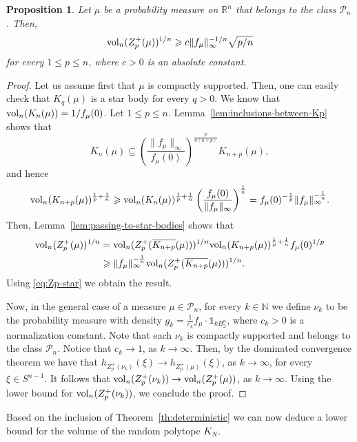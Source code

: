 \documentclass[11pt,leqno]{article}
\newtheorem{proposition}[theorem]{Proposition}
\theoremstyle{definition}
\theoremstyle{remark}
\numberwithin{equation}{section}
\newcommand{\vol}{{\rm vol}}
\newcommand{\ls}{\leqslant}
\newcommand{\gr}{\geqslant}
\newcommand{\1}{\textbf{1}}
\begin{document}
\begin{proposition}\label{prop:LYZ}
Let $\mu$ be a probability measure on $\mathbb{R}^n$ that belongs to the class $\mathcal{P}_n$. Then,
\begin{equation*}\vol_n(Z_p^+(\mu))^{1/n}\gr c\|f_{\mu}\|_{\infty}^{-1/n}\sqrt{p/n}\end{equation*}
for every $1\ls p\ls n$, where $c>0$ is an absolute constant.
\end{proposition}

\begin{proof} Let us assume first that $\mu$ is compactly supported. Then, one can easily check that
$K_q(\mu)$ is a star body for every $q>0$. We know that $\vol_n(K_n(\mu))=1/f_{\mu}(0)$. Let $1\ls p\ls n$.
Lemma~\ref{lem:inclusions-between-Kp} shows that
\begin{equation*}K_n(\mu)\subseteq
\left(\frac{\|f_{\mu}\|_{\infty}}{f_{\mu}(0)}\right)^{\frac{p}{n(n+p)}}K_{n+p}(\mu),
\end{equation*}
and hence
$$\vol_n(K_{n+p}(\mu))^{\frac{1}{p}+\frac{1}{n}}\gr \vol_n(K_n(\mu))^{\frac{1}{p}+\frac{1}{n}}\left(\frac{f_{\mu}(0)}{\|f_{\mu}\|_{\infty}}\right)^{\frac{1}{n}}=
f_{\mu}(0)^{-\frac{1}{p}}\|f_{\mu}\|_{\infty}^{-\frac{1}{n}}.$$
Then, Lemma~\ref{lem:passing-to-star-bodies} shows that
\begin{align*}
\vol_n(Z_p^+(\mu))^{1/n} &=\vol_n(Z_p^+(\overline{K_{n+p}}(\mu)))^{1/n}\vol_n(K_{n+p}(\mu))^{\frac{1}{p}+\frac{1}{n}}
f_{\mu}(0)^{1/p}\\
&\gr \|f_{\mu}\|_{\infty}^{-\frac{1}{n}}\vol_n(Z_p^+(\overline{K_{n+p}}(\mu)))^{1/n}.\end{align*}
Using \eqref{eq:Zp-star} we obtain the result.

Now, in the general case of a measure $\mu\in\mathcal{P}_n$, for every $k \in \mathbb{N}$ we define $\nu_k$ to be the
probability measure with density $g_k=\frac{1}{c_k}f_\mu \cdot \mathds{1}_{kB_{2}^n}$, where  $c_k>0$ is a normalization
constant. Note that each $\nu_k$ is compactly supported and belongs to the class $\mathcal{P}_n$.
Notice that $c_k \to 1$, as $k \to \infty$. Then, by the dominated convergence theorem we have that $h_{Z_{p}^+(\nu_k)}(\xi) \to h_{Z_{p}^+(\mu)}(\xi) $, as $k \to \infty$, for every $\xi \in S^{n-1}$. It follows that
$\vol_n(Z_{p}^+(\nu_k)) \to \vol_n(Z_{p}^+(\mu)) $, as $k \to \infty$. Using the lower bound for
$\vol_n(Z_{p}^+(\nu_k))$, we conclude the proof.
\end{proof}

Based on the inclusion of Theorem~\ref{th:deterministic} we can now deduce a lower bound for the volume of the random polytope $K_N$.
\end{document}
